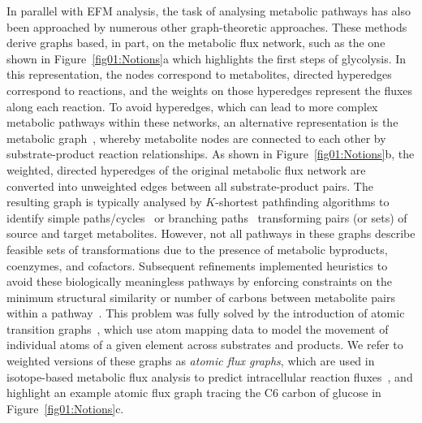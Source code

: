 \documentclass[12pt]{article}
\begin{document}
In parallel with EFM analysis, the task of analysing metabolic
pathways has also been approached by numerous other graph-theoretic
approaches. These methods derive graphs based, in part, on the metabolic
flux network, such as the one shown in Figure~\ref{fig01:Notions}a which
highlights the first steps of glycolysis. In this representation, the
nodes correspond to metabolites, directed hyperedges correspond to
reactions, and the weights on those hyperedges represent the fluxes along
each reaction. To avoid hyperedges, which can lead to more complex
metabolic pathways within these networks, an alternative representation is
the metabolic graph~\citep{AritaMasanori2000Mrus,WagnerAndreas2001Tswi},
whereby metabolite nodes are connected to each other by substrate-product
reaction relationships. As shown in Figure~\ref{fig01:Notions}b, the
weighted, directed hyperedges of the original metabolic flux network are
converted into unweighted edges between all substrate-product pairs. The
resulting graph is typically analysed by $K$-shortest pathfinding algorithms to
identify simple
paths/cycles~\citep{BlumTorsten2008Mfsf,HeathAllisonP.2010Fmpu,LatendresseMario2014Omrs,KimSarahM.2020Itoa}
or branching
paths~\citep{PitkanenEsa2009Ibpi,HeathAllisonP.2010Fmpu,HeathAllisonP.2011AAfE}
transforming pairs (or sets) of source and target metabolites. However,
not all pathways in these graphs describe feasible sets of transformations
due to the presence of metabolic byproducts, coenzymes, and cofactors.
Subsequent refinements implemented heuristics to avoid these biologically
meaningless pathways by enforcing constraints on the minimum structural
similarity or number of carbons between metabolite pairs within
a pathway~\citep{McShanD2003PathMiner,RahmanSA2004Mpaw,CroesDidier2006IMPi,PeyJon2011Pfma,HafnerJasmin2021NFmp}.
This problem was fully solved by the introduction of atomic transition
graphs~\citep{AritaMasanori2003ISAT}, which use atom mapping data to model
the movement of individual atoms of a given element across substrates and
products. We refer to weighted versions of these graphs as \emph{atomic
flux graphs}, which are used in isotope-based metabolic flux analysis to
predict intracellular reaction
fluxes~\citep{WiechertWolfgang1999Brsi,WeitzelMichael2007Ttom}, and
highlight an example atomic flux graph tracing the C6 carbon of glucose in
Figure~\ref{fig01:Notions}c.
\end{document}
